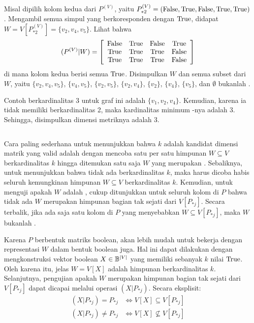 Misal dipilih kolom kedua dari \(P^{(V)}\), yaitu \(P^{(V)}_{*2} = (\False, \True, \False, \True, \True)\). Mengambil semua simpul yang berkoresponden dengan \(\True\), didapat \(W = V[P^{(V)}_{*2}] = \{v_2, v_4, v_5\}\). Lihat bahwa
\[
	(P^{(V)}|W) = \left[ \begin{array}{ccccc}
		\False &  \True & \False &  \True \\
		 \True &  \True &  \True & \False \\
		 \True &  \True &  \True & \False \\
	\end{array} \right]
\]
di mana kolom kedua berisi semua \(\True\). Disimpulkan \(W\) dan semua subset dari \(W\), yaitu \(\{v_2, v_4, v_5\}\), \(\{v_4, v_5\}\), \(\{v_2, v_5\}\), \(\{v_2, v_4\}\), \(\{v_2\}\), \(\{v_4\}\), \(\{v_5\}\), dan \(\emptyset\) bukanlah .

Contoh  berkardinalitas 3 untuk graf ini adalah \(\{v_1, v_2, v_4\}\). Kemudian, karena ia tidak memiliki  berkardinalitas 2, maka kardinalitas minimum -nya adalah 3. Sehingga, disimpulkan dimensi metriknya adalah 3.

\subsection{}
\label{subsec:bf}

Cara paling sederhana untuk menunjukkan bahwa \(k\) adalah kandidat dimensi matrik yang valid adalah dengan mencoba satu per satu himpunan \(W \subseteq V\) berkardinalitas \(k\) hingga ditemukan satu saja \(W\) yang merupakan . Sebaliknya, untuk menunjukkan bahwa tidak ada  berkardinalitas \(k\), maka harus dicoba habis seluruh kemungkinan himpunan \(W \subseteq V\) berkardinalitas \(k\). Kemudian, untuk menguji apakah \(W\) adalah , cukup ditunjukkan untuk seluruh kolom di \(P\) bahwa tidak ada \(W\) merupakan himpunan bagian tak sejati dari \(V[P_{*j}]\). Secara terbalik, jika ada saja satu kolom di \(P\) yang menyebabkan \(W \subseteq V[P_{*j}]\), maka \(W\) bukanlah .

Karena \(P\) berbentuk matriks boolean, akan lebih mudah untuk bekerja dengan representasi \(W\) dalam bentuk boolean juga. Hal ini dapat dilakukan dengan mengkonstruksi vektor boolean \(X \in \Bbb^{|V|}\) yang memiliki sebanyak \(k\) nilai \(\True\). Oleh karena itu, jelas \(W = V[X]\) adalah himpunan berkardinalitas \(k\). Selanjutnya, pengujian apakah \(W\) merupakan himpunan bagian tak sejati dari \(V[P_{*j}]\) dapat dicapai melalui operasi \((X|P_{*j})\). Secara eksplisit:
\[
	\begin{array}{rl}
		(X|P_{*j}) = P_{*j}  &\iff V[X] \subseteq V[P_{*j}] \\
		(X|P_{*j}) \neq P_{*j}  &\iff V[X] \not\subseteq V[P_{*j}]
	\end{array}
\]

